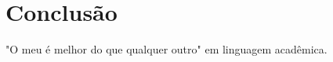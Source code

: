 \documentclass[cic,tc]{iiufrgs}
\begin{document}
%
%


\chapter{Conclusão}
"O meu é melhor do que qualquer outro" em linguagem acadêmica.
\end{document}
